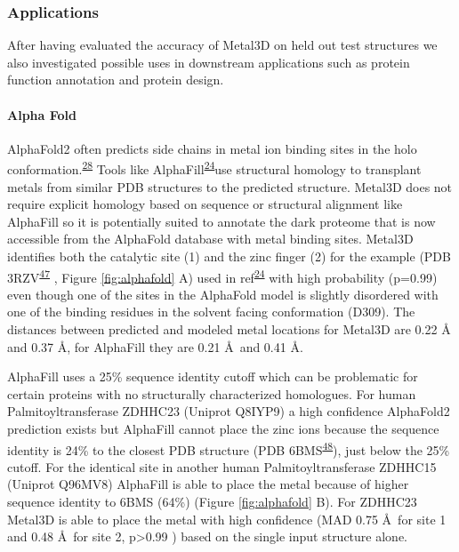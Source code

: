 \documentclass[  ASAPversion,
  ,
  9pt]{elife}
\begin{document}
\hypertarget{applications}{%
\subsubsection{Applications}\label{applications}}

After having evaluated the accuracy of Metal3D on held out test structures we also investigated possible uses in downstream applications such as protein function annotation and protein design.

\hypertarget{alpha-fold}{%
\paragraph{Alpha Fold}\label{alpha-fold}}

AlphaFold2 often predicts side chains in metal ion binding sites in the holo conformation.\textsuperscript{\protect\hyperlink{ref-yZfcMIwh}{28}} Tools like AlphaFill\textsuperscript{\protect\hyperlink{ref-13fLqNwbD}{24}}use structural homology to transplant metals from similar PDB structures to the predicted structure. Metal3D does not require explicit homology based on sequence or structural alignment like AlphaFill so it is potentially suited to annotate the dark proteome that is now accessible from the AlphaFold database with metal binding sites. Metal3D identifies both the catalytic site (1) and the zinc finger (2) for the example (PDB 3RZV\textsuperscript{\protect\hyperlink{ref-wW700ShK}{47}} , Figure \ref{fig:alphafold} A) used in ref\textsuperscript{\protect\hyperlink{ref-13fLqNwbD}{24}} with high probability (p=0.99) even though one of the sites in the AlphaFold model is slightly disordered with one of the binding residues in the solvent facing conformation (D309). The distances between predicted and modeled metal locations for Metal3D are 0.22 \AA\, and 0.37 \AA , for AlphaFill they are 0.21 \AA\, and 0.41 \AA .

AlphaFill uses a 25\% sequence identity cutoff which can be problematic for certain proteins with no structurally characterized homologues. For human Palmitoyltransferase ZDHHC23 (Uniprot Q8IYP9) a high confidence AlphaFold2 prediction exists but AlphaFill cannot place the zinc ions because the sequence identity is 24\% to the closest PDB structure (PDB 6BMS\textsuperscript{\protect\hyperlink{ref-RFwEiPTW}{48}}), just below the 25\% cutoff. For the identical site in another human Palmitoyltransferase ZDHHC15 (Uniprot Q96MV8) AlphaFill is able to place the metal because of higher sequence identity to 6BMS (64\%) (Figure \ref{fig:alphafold} B). For ZDHHC23 Metal3D is able to place the metal with high confidence (MAD 0.75 \AA\, for site 1 and 0.48 \AA\, for site 2, p\textgreater0.99 ) based on the single input structure alone.
\end{document}
